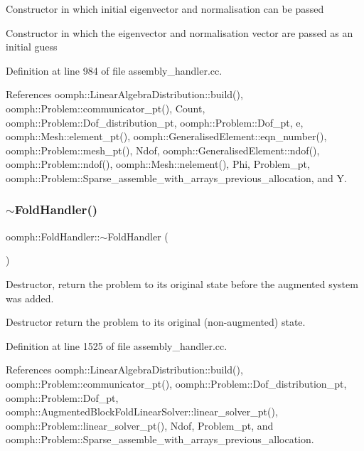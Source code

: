 Constructor in which initial eigenvector and normalisation can be passed

Constructor in which the eigenvector and normalisation vector are passed as an initial guess 

Definition at line 984 of file assembly\+\_\+handler.\+cc.



References oomph\+::\+Linear\+Algebra\+Distribution\+::build(), oomph\+::\+Problem\+::communicator\+\_\+pt(), Count, oomph\+::\+Problem\+::\+Dof\+\_\+distribution\+\_\+pt, oomph\+::\+Problem\+::\+Dof\+\_\+pt, e, oomph\+::\+Mesh\+::element\+\_\+pt(), oomph\+::\+Generalised\+Element\+::eqn\+\_\+number(), oomph\+::\+Problem\+::mesh\+\_\+pt(), Ndof, oomph\+::\+Generalised\+Element\+::ndof(), oomph\+::\+Problem\+::ndof(), oomph\+::\+Mesh\+::nelement(), Phi, Problem\+\_\+pt, oomph\+::\+Problem\+::\+Sparse\+\_\+assemble\+\_\+with\+\_\+arrays\+\_\+previous\+\_\+allocation, and Y.

\mbox{\label{classoomph_1_1FoldHandler_ab582d9ac969e0f7779a285d21a6d8e45}} 
\subsubsection{\texorpdfstring{$\sim$\+Fold\+Handler()}{~FoldHandler()}}
{\footnotesize\ttfamily oomph\+::\+Fold\+Handler\+::$\sim$\+Fold\+Handler (\begin{DoxyParamCaption}{ }\end{DoxyParamCaption})}



Destructor, return the problem to its original state before the augmented system was added. 

Destructor return the problem to its original (non-\/augmented) state. 

Definition at line 1525 of file assembly\+\_\+handler.\+cc.



References oomph\+::\+Linear\+Algebra\+Distribution\+::build(), oomph\+::\+Problem\+::communicator\+\_\+pt(), oomph\+::\+Problem\+::\+Dof\+\_\+distribution\+\_\+pt, oomph\+::\+Problem\+::\+Dof\+\_\+pt, oomph\+::\+Augmented\+Block\+Fold\+Linear\+Solver\+::linear\+\_\+solver\+\_\+pt(), oomph\+::\+Problem\+::linear\+\_\+solver\+\_\+pt(), Ndof, Problem\+\_\+pt, and oomph\+::\+Problem\+::\+Sparse\+\_\+assemble\+\_\+with\+\_\+arrays\+\_\+previous\+\_\+allocation.



